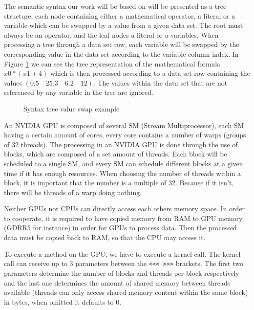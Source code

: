 \documentclass[runningheads]{llncs}
\begin{document}
The semantic syntax our work will be based on will be presented as a tree structure, each node containing either a mathematical operator, a literal or a variable which can be swapped by a value from a given data set. The root must always be an operator, and the leaf nodes a literal or a variables.
When processing a tree through a data set row, each variable will be swapped by the corresponding value in the data set according to the variable column index. In Figure \ref{syntree} we can see the tree representation of the mathematical formula $x0 * (x1+4)$ which is then processed according to a data set row containing the values $(0.5\quad 25.3\quad 6.2\quad 12)$. The values within the data set that are not referenced by any variable in the tree are ignored.
\begin{figure}

\hfil
{}
\hfil
\caption{Syntax tree value swap example}
\label{syntree}
\end{figure}


An NVIDIA GPU is composed of several SM (Stream Multiprocessor), each SM having a certain amount of cores, every core contains a number of warps (groups of 32 threads).
The processing in an NVIDIA GPU is done through the use of blocks, which are composed of a set amount of threads. Each block will be scheduled to a single SM, and every SM can schedule different blocks at a given time if it has enough resources. When choosing the number of threads within a block, it is important that the number is a multiple of 32. Because if it isn't, there will be threads of a warp doing nothing.

Neither GPUs nor CPUs can directly access each others memory space. In order to cooperate, it is required to have copied memory from RAM to GPU memory (GDRR5 for instance) in order for GPUs to process data. Then the processed data must be copied back to RAM, so that the CPU may access it.

To execute a method on the GPU, we have to execute a kernel call. The kernel call can receive up to 3 parameters between the \texttt{<<< >>>} brackets. The first two parameters determine the number of blocks and threads per block respectively and the last one determines the amount of shared memory between threads available (threads can only access shared memory content within the same block) in bytes, when omitted it defaults to 0.
\end{document}
